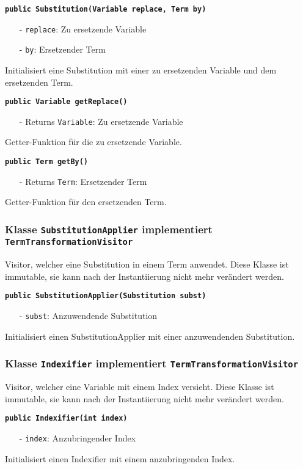 \documentclass[parskip=full,11pt,twoside]{scrartcl}
\begin{document}
\textbf{\texttt{public Substitution(Variable replace, Term by)}}
\begin{itemize}[noitemsep]
	\item[-] \texttt{replace}: Zu ersetzende Variable
	\item[-] \texttt{by}: Ersetzender Term
\end{itemize}
Initialisiert eine Substitution mit einer zu ersetzenden Variable und dem ersetzenden Term.

\textbf{\texttt{public Variable getReplace()}}
\begin{itemize}[noitemsep]
	\item[-] Returns \texttt{Variable}: Zu ersetzende Variable
\end{itemize}
Getter-Funktion für die zu ersetzende Variable.

\textbf{\texttt{public Term getBy()}}
\begin{itemize}[noitemsep]
	\item[-] Returns \texttt{Term}: Ersetzender Term
\end{itemize}
Getter-Funktion für den ersetzenden Term.

\subsubsection{Klasse \texttt{SubstitutionApplier} implementiert \texttt{TermTransformationVisitor}}
Visitor, welcher eine Substitution in einem Term anwendet. Diese Klasse ist immutable, sie kann nach der Instantiierung nicht mehr verändert werden.

\textbf{\texttt{public SubstitutionApplier(Substitution subst)}}
\begin{itemize}[noitemsep]
	\item[-] \texttt{subst}: Anzuwendende Substitution
\end{itemize}
Initialisiert einen SubstitutionApplier mit einer anzuwendenden Substitution.

\subsubsection{Klasse \texttt{Indexifier} implementiert \texttt{TermTransformationVisitor}}
Visitor, welcher eine Variable mit einem Index versieht. Diese Klasse ist immutable, sie kann nach der Instantiierung nicht mehr verändert werden.

\textbf{\texttt{public Indexifier(int index)}}
\begin{itemize}[noitemsep]
	\item[-] \texttt{index}: Anzubringender Index
\end{itemize}
Initialisiert einen Indexifier mit einem anzubringenden Index.
\end{document}
